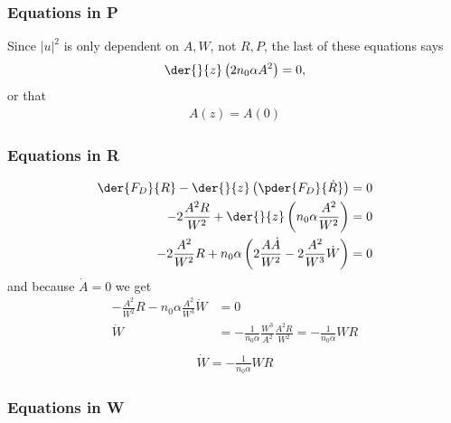 \subsubsection{Equations in P}
Since $|u|^2$ is only dependent on $A,W$, not $R,P$, the last of these equations says
\begin{equation}
\begin{split}
    \der{}{z}\left( 2 n_0 \alpha A^2 \right) = 0,
\end{split}
\end{equation}
or that
\begin{equation}
\begin{split}
    A(z) = A(0)
\end{split}
\end{equation}

\subsubsection{Equations in R}
\begin{equation}
\begin{split}
    \der{F_{D}}{R}  - \der{}{z}\left(\pder{F_{D}}{\dot{R}}\right) &= 0 \\
  -  2 \frac{A^2R}{W^2} + \der{}{z}\left(  n_0 \alpha \frac{A^2}{W^2}\right) &=0 \\
-2 \frac{A^2}{W^2}R + n_0 \alpha \left(  2\frac{A \dot{A}}{W^2} - 2\frac{A^2}{W^3}\dot{W}\right) &=0
\end{split}
\end{equation}
and because $\dot{A} = 0$ we get
\begin{equation}
\begin{split}
 -\frac{A^2}{W^2}R  - n_0 \alpha \frac{A^2}{W^3}\dot{W} &=0 \\
  \dot{W} &= - \frac{1}{n_0 \alpha}\frac{W^3}{ A^2} \frac{A^2R}{W^2} = -\frac{1}{n_0 \alpha} W R   \\
\end{split}
\end{equation}
\begin{equation}
\begin{split}
  \dot{W} = -\frac{1}{n_0 \alpha} W R
\end{split}
\end{equation}

\subsubsection{Equations in W}


